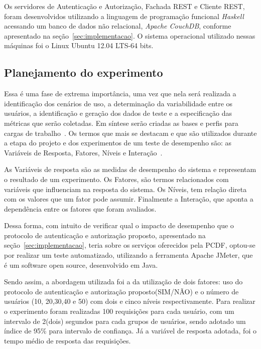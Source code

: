 Os servidores de Autenticação e Autorização, Fachada REST e Cliente REST, foram desenvolvidos utilizando a linguagem de programação funcional \emph{Haskell} acessando um banco de dados não relacional, \emph{Apache CouchDB}, conforme apresentado na seção~\ref{sec:implementacao}. O sistema operacional utilizado nessas máquinas foi o Linux Ubuntu 12.04 LTS-64 bits.



\subsection{Planejamento do experimento}

Essa é uma fase de extrema importância, uma vez que nela será realizada a identificação dos cenários de uso, a determinação da variabilidade entre os usuários, a identificação e geração dos dados de teste e a especificação das métricas que serão coletadas. Em síntese serão criadas as bases e perfis para cargas de trabalho~\cite{Meier2007}.
Os termos que mais se destacam e que são utilizados durante a etapa do projeto e dos experimentos de um teste de desempenho são: as Variáveis de Resposta, Fatores, Níveis e Interação~\cite{jain1991art}.

As Variáveis de resposta são as medidas de desempenho do sistema e representam o resultado de um experimento. Os Fatores, são termos relacionados com variáveis que influenciam na resposta do sistema. Os Níveis, tem relação direta com os valores que um fator pode assumir. Finalmente a Interação, que aponta a dependência entre os fatores que foram avaliados.

Dessa forma, com intuito de verificar qual o impacto de desempenho que o protocolo de autenticação e autorização proposto, apresentado na seção~\ref{sec:implementacao}, teria sobre os serviços oferecidos pela PCDF, optou-se por realizar um teste automatizado, utilizando a ferramenta Apache JMeter, que é um software open source, desenvolvido em Java.

Sendo assim, a abordagem utilizada foi a da utilização de dois fatores: uso do protocolo de autenticação e autorização proposto(SIM/NÃO) e o número de usuários (10, 20,30,40 e 50) com dois e cinco níveis respectivamente. Para realizar o experimento foram realizadas 100 requisições para cada usuário, com um intervalo de 2(dois) segundos para cada grupos de usuários, sendo adotado um índice de 95\% para intervalo de confiança. Já a variável de resposta adotada, foi o tempo médio de resposta das requisições.

